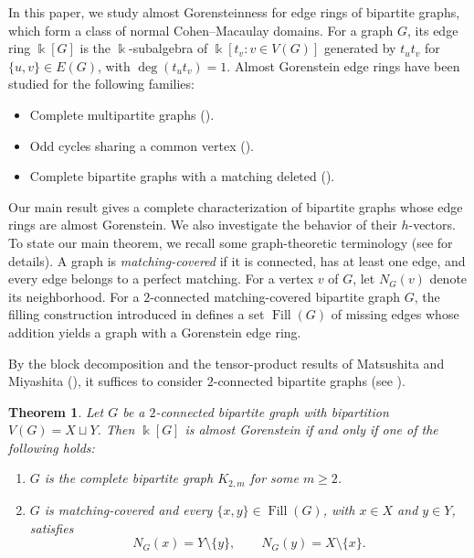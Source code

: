 \documentclass[a4paper,reqno,11pt]{amsart}
\newtheorem{thm}{Theorem}[section]
\theoremstyle{definition}
\theoremstyle{remark}
\numberwithin{equation}{section}
\newcommand{\kk}{\Bbbk}
\newcommand{\Fill}{\operatorname{Fill}}
\begin{document}
In this paper, we study almost Gorensteinness for edge rings of bipartite graphs, which form a class of normal Cohen--Macaulay domains.
For a graph $G$, its edge ring $\kk[G]$ is the $\kk$-subalgebra of $\kk[t_v:v\in V(G)]$ generated by $t_ut_v$ for $\{u,v\}\in E(G)$, with $\deg(t_ut_v)=1$.
Almost Gorenstein edge rings have been studied for the following families:
\begin{itemize}
    \item Complete multipartite graphs (\cite{higashitani2022levelness}).
    \item Odd cycles sharing a common vertex (\cite{higashitani2023h,bhaskara2026h}).
    \item Complete bipartite graphs with a matching deleted (\cite{hatasa2025pseudo}).
\end{itemize}

Our main result gives a complete characterization of bipartite
graphs whose edge rings are almost Gorenstein.
We also investigate the behavior of their $h$-vectors.
To state our main theorem, we recall some graph-theoretic
terminology (see  for details).
A graph is \textit{matching-covered} if it is connected, has at
least one edge, and every edge belongs to a perfect matching.
For a vertex $v$ of $G$, let $N_G(v)$ denote its neighborhood.
For a $2$-connected matching-covered bipartite graph $G$,
the filling construction introduced in
\cite{hatasa2026palindromicity} defines a set $\Fill(G)$
of missing edges whose addition yields a graph with a
Gorenstein edge ring.

By the block decomposition and the tensor-product results of Matsushita and Miyashita (\cite{matsushita2024multiplicity}), it suffices to consider $2$-connected bipartite graphs (see ).
\begin{thm}\label{thm:main}
    Let $G$ be a $2$-connected bipartite graph with bipartition $V(G)=X\sqcup Y$.
    Then $\kk[G]$ is almost Gorenstein if and only if one of the following holds:
    \begin{enumerate}
        \item $G$ is the complete bipartite graph $K_{2,m}$ for some $m\ge2$.
        \item $G$ is matching-covered and every $\{x,y\}\in\Fill(G)$, with $x\in X$ and $y\in Y$, satisfies
              \begin{equation*}
                  N_G(x)=Y\setminus\{y\},\qquad N_G(y)=X\setminus\{x\}.
              \end{equation*}
    \end{enumerate}
\end{thm}
\end{document}
